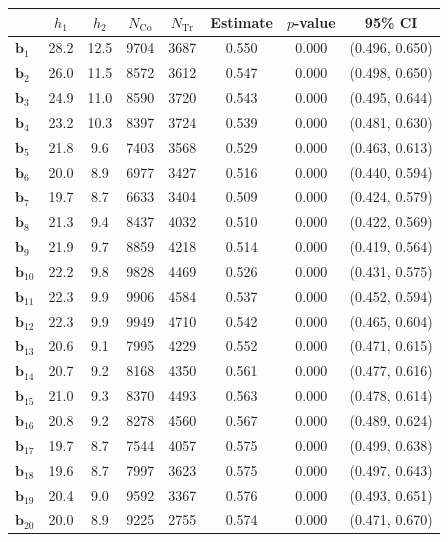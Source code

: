 \documentclass[10pt]{article}
\newcommand{\bb}{\mathbf{b}}
\begin{document}
\begin{table}[p]
    \centering
\begin{tabular}{lccccccc}
  \toprule\toprule
   & $h_1$ & $h_2$ & $N_{\mathrm{Co}}$ & $N_{\mathrm{Tr}}$ & Estimate & $p$-value & 95\% CI \\
  \midrule
   $\bb_{1}$ & 28.2 & 12.5 & 9704 & 3687 & 0.550 & 0.000 & (0.496, 0.650)\\
   $\bb_{2}$ & 26.0 & 11.5 & 8572 & 3612 & 0.547 & 0.000 & (0.498, 0.650)\\
   $\bb_{3}$ & 24.9 & 11.0 & 8590 & 3720 & 0.543 & 0.000 & (0.495, 0.644)\\
   $\bb_{4}$ & 23.2 & 10.3 & 8397 & 3724 & 0.539 & 0.000 & (0.481, 0.630)\\
   $\bb_{5}$ & 21.8 & 9.6 & 7403 & 3568 & 0.529 & 0.000 & (0.463, 0.613)\\
   $\bb_{6}$ & 20.0 & 8.9 & 6977 & 3427 & 0.516 & 0.000 & (0.440, 0.594)\\
   $\bb_{7}$ & 19.7 & 8.7 & 6633 & 3404 & 0.509 & 0.000 & (0.424, 0.579)\\
   $\bb_{8}$ & 21.3 & 9.4 & 8437 & 4032 & 0.510 & 0.000 & (0.422, 0.569)\\
   $\bb_{9}$ & 21.9 & 9.7 & 8859 & 4218 & 0.514 & 0.000 & (0.419, 0.564)\\
   $\bb_{10}$ & 22.2 & 9.8 & 9828 & 4469 & 0.526 & 0.000 & (0.431, 0.575)\\
   $\bb_{11}$ & 22.3 & 9.9 & 9906 & 4584 & 0.537 & 0.000 & (0.452, 0.594)\\
   $\bb_{12}$ & 22.3 & 9.9 & 9949 & 4710 & 0.542 & 0.000 & (0.465, 0.604)\\
   $\bb_{13}$ & 20.6 & 9.1 & 7995 & 4229 & 0.552 & 0.000 & (0.471, 0.615)\\
   $\bb_{14}$ & 20.7 & 9.2 & 8168 & 4350 & 0.561 & 0.000 & (0.477, 0.616)\\
   $\bb_{15}$ & 21.0 & 9.3 & 8370 & 4493 & 0.563 & 0.000 & (0.478, 0.614)\\
   $\bb_{16}$ & 20.8 & 9.2 & 8278 & 4560 & 0.567 & 0.000 & (0.489, 0.624)\\
   $\bb_{17}$ & 19.7 & 8.7 & 7544 & 4057 & 0.575 & 0.000 & (0.499, 0.638)\\
   $\bb_{18}$ & 19.6 & 8.7 & 7997 & 3623 & 0.575 & 0.000 & (0.497, 0.643)\\
   $\bb_{19}$ & 20.4 & 9.0 & 9592 & 3367 & 0.576 & 0.000 & (0.493, 0.651)\\
   $\bb_{20}$ & 20.0 & 8.9 & 9225 & 2755 & 0.574 & 0.000 & (0.471, 0.670)\\

\end{tabular}
\end{table}
\end{document}
